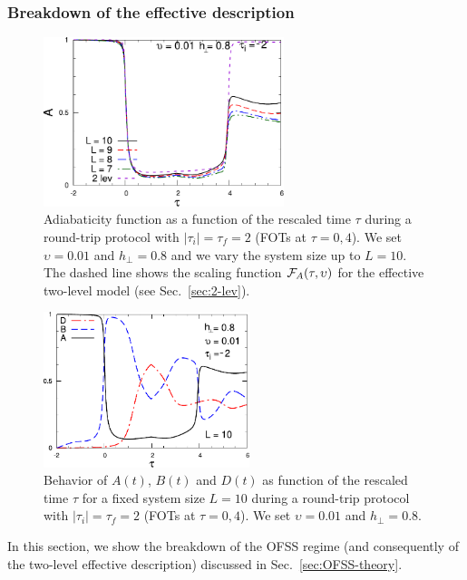 \subsubsection{Breakdown of the effective description}\label{sec:break}

	\begin{figure}[!h]
		\centering
		\includegraphics[width=7cm]{imm/tripAt2u001g08-new.pdf}
		\caption{Adiabaticity function as a function of the rescaled time $\tau$ during a round-trip protocol with $|\tau_i|=\tau_f =2$ (FOTs at $\tau=0,4$). We set $\upsilon = 0.01$ and $h_\perp = 0.8$ and we vary the system size up to $L = 10$.  The dashed line shows the scaling function ${\cal F}_A(\tau,\upsilon)$ for the effective two-level model (see Sec.~\ref{sec:2-lev}).}
		\label{tripAt2u001g08}
	\end{figure}

	\begin{figure}[!h]
		\centering
		\includegraphics[width=6cm]{imm/tripABDt2u001g08L10-new.pdf}
		\caption{Behavior of $A(t)$, 
		$B(t)$ and $D(t)$ as function of the rescaled time $\tau$ 
		 for a fixed system size $L = 10$ during a round-trip protocol with $|\tau_i|=\tau_f=2$ (FOTs at $\tau=0,4$). We set $\upsilon = 0.01$ and $h_\perp = 0.8$.}
		\label{tripABDt2u001g08L10}
	\end{figure}
In this section, we show the breakdown of the OFSS regime (and consequently of the two-level effective description) discussed in Sec.~\ref{sec:OFSS-theory}. \\

